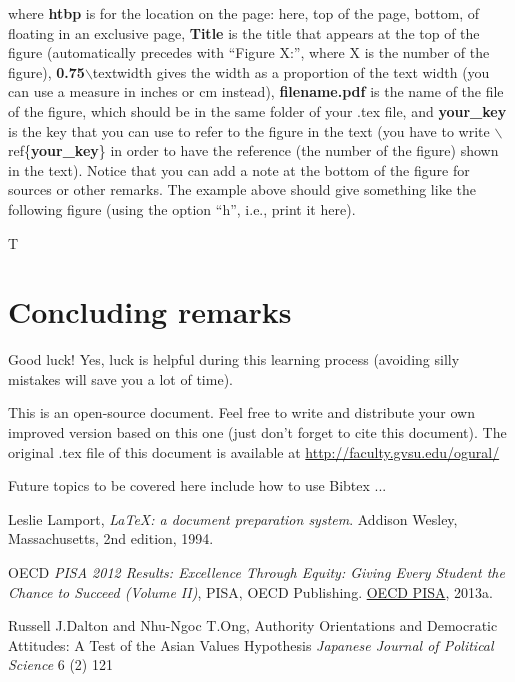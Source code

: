 \documentclass[12pt]{article}%
\begin{document}
\noindent where \textbf{htbp} is for the location on the page: here, top of the page, bottom, of floating in an exclusive page, \textbf{Title} is the title that appears at the top of the figure (automatically precedes with ``Figure X:'', where X is the number of the figure), \textbf{0.75}$\backslash$textwidth gives the width as a proportion of the text width (you can use a measure in inches or cm instead), \textbf{filename.pdf} is the name of the file of the figure, which should be in the same folder of your .tex file,  and \textbf{your\_key} is the key that you can use to refer to the figure in the text (you have to write $\backslash$ref\{\textbf{your\_key}\} in order to have the reference (the number of the figure) shown in the text). Notice that you can add a note at the bottom of the figure for sources or other remarks. The example above should give something like the following figure (using the option ``h'', i.e., print it here).


T

\section{Concluding remarks}

Good luck! Yes, luck is helpful during this learning process (avoiding silly mistakes will save you a lot of time).

This is an open-source document. Feel free to write and distribute your own improved version based on this one (just don't forget to cite this document). The original .tex file of this document is available at \href{http://faculty.gvsu.edu/ogural/}{http://faculty.gvsu.edu/ogural/}

Future topics to be covered here include how to use Bibtex ...


\begin{thebibliography}{9} %

   Leslie Lamport,
   \emph{\LaTeX: a document preparation system}.
   Addison Wesley, Massachusetts,
   2nd edition,
   1994.

OECD \emph{PISA 2012 Results: Excellence Through Equity: Giving Every 
Student the Chance to Succeed (Volume II)}, PISA, OECD Publishing.
\href{http://www.oecd.org/pisa/keyfindings/pisa-2012-results-volume-ii.htm}{OECD PISA},
2013a.

 Russell J.Dalton and Nhu-Ngoc T.Ong,
 Authority Orientations and Democratic Attitudes: A Test of the Asian Values
Hypothesis
\emph{Japanese Journal of Political Science} 6 (2) 121
\end{thebibliography}
\end{document}
